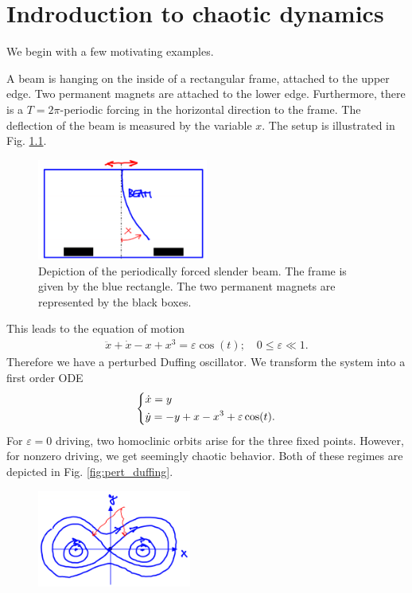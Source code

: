 \chapter{Indroduction to chaotic dynamics}
We begin with a few motivating examples.
\begin{ex}
	A beam is hanging on the inside of a rectangular frame, attached to the upper edge. Two permanent magnets are attached to the lower edge. Furthermore, there is a $T=2 \pi $-periodic forcing in the horizontal direction to the frame. The deflection of the beam is measured by the variable $x$. The setup is illustrated in Fig. \ref{fig:forced_slender_beam}.
	\begin{figure}[h!]
		\centering
		\includegraphics[width=0.5\textwidth]{figures/ch6/1forced_slender_beam.png}
		\caption{Depiction of the periodically forced slender beam. The frame is given by the blue rectangle. The two permanent magnets are represented by the black boxes.}
		\label{fig:forced_slender_beam}
	\end{figure}
This leads to the equation of motion
\begin{align}
	\ddot{x} + \dot{x} - x + x^3 = \varepsilon \cos(t);\quad 0 \leq \varepsilon \ll 1.
\end{align}
Therefore we have a perturbed Duffing oscillator. We transform the system into a first order ODE
\begin{align}
	\begin{dcases}
		\dot{x} = y \\
		\dot{y} = -y +x - x^3 + \varepsilon \cos(t).
	\end{dcases}
\end{align}
For $\varepsilon =0$ driving, two homoclinic orbits arise for the three fixed points. However, for nonzero driving, we get seemingly chaotic behavior. Both of these regimes are depicted in Fig. \ref{fig:pert_duffing}.
\begin{figure}[h!]
	\centering
	\includegraphics[width=0.45\textwidth]{figures/ch6/3unpert_duffing.png}

\end{figure}
\end{ex}
